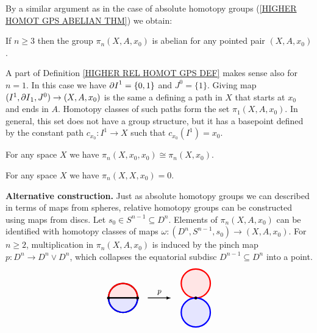 By a similar argument as in the case of absolute homotopy groups 
(\ref{HIGHER HOMOT GPS ABELIAN THM}) we obtain: 

\begin{theorem}
If $n\geq 3$ then the group $\pi_{n}(X, A, x_{0})$ is abelian for any 
pointed pair $(X, A, x_{0})$. 
\end{theorem}


\begin{note}
A part of Definition \ref{HIGHER REL HOMOT GPS DEF} makes sense also for $n=1$. 
In this case we have ${\partial I}^{1} = \{0, 1\}$ and $J^{0} = \{1\}$. 
Giving map $(I^{1}, {\partial I}_{1}, J^{0})\to (X, A, x_{0})$ is the same a defining 
a path in $X$ that starts at $x_{0}$ and ends in $A$.  Homotopy classes of such 
paths form the set $\pi_{1}(X, A, x_{0})$. In general, this set does not have a group
structure, but it has a basepoint defined by the constant path $c_{x_{0}}\colon I^{1} \to X$
such that $c_{x_{0}}(I^{1}) = x_{0}$.
\end{note}




\begin{proposition}
For any space $X$ we have $\pi_{n}(X, x_{0}, x_{0}) \cong \pi_{n}(X, x_{0})$. 
\end{proposition}

\begin{proposition}
For any space $X$ we have  $\pi_{n}(X, X, x_{0}) = 0$. 
\end{proposition}


\begin{nn}{\bf Alternative construction.}
Just as absolute homotopy groups we can described in terms of maps from spheres, 
relative homotopy groups can be constructed using maps from discs. 
Let $s_{0}\in S^{n-1}\subseteq D^{n}$. Elements of $\pi_{n}(X, A, x_{0})$ can be 
identified with homotopy classes of maps $\omega\colon (D^{n}, S^{n-1}, s_{0}) \to (X, A, x_{0})$.
For $n\geq 2$, multiplication in $\pi_{n}(X, A, x_{0})$ is induced by the pinch map 
$p\colon D^{n} \to D^{n}\vee D^{n}$, which collapses the equatorial subdisc 
$D^{n-1}\subseteq D^{n}$ into a point.
\begin{equation*}
\begin{tikzpicture}[scale=0.6]
\filldraw[red!10, draw=black, line width=1.6pt] (-1.0,0) -- (1.0,0) arc(0:180:1.0) -- cycle;
\filldraw[blue!10, draw=black, line width=1.6pt] (-1.0,0) -- (1.0,0) arc(0:-180:1.0) -- cycle;
\draw[red, line width=1.6pt] (1.0,0) arc(0:180:1.0);
\draw[blue, line width=1.6pt] (1.0,0) arc(0:-180:1.0);
\fill (-1, 0) circle (0.1);
\fill (1, 0) circle (0.1);

\draw[thick, ->, >=latex] (1.7,0) -- node[anchor=south] {\small $p$} (3.3,0);
\filldraw[red!10, draw=red, line width=1.6pt] (5, 1) circle (1);
\filldraw[blue!10, draw=blue, line width=1.6pt] (5, -1) circle (1);
\fill (5, 0) circle (0.1);
\end{tikzpicture}
\end{equation*} 
\end{nn}


